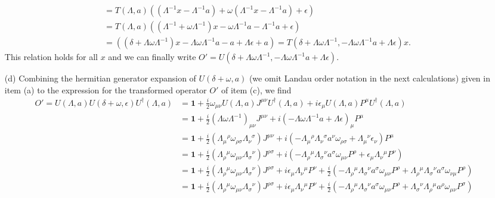 \documentclass[10pt, a4paper]{article}
\begin{document}
\begin{enumerate}
\begin{align*}
    &= T(\Lambda, a) ((\Lambda^{-1} x - \Lambda^{-1} a) + \omega(\Lambda^{-1} x - \Lambda^{-1} a) + \epsilon)\\
    &= T(\Lambda, a) ((\Lambda^{-1} + \omega \Lambda^{-1})  x -\omega \Lambda^{-1} a - \Lambda^{-1} a + \epsilon)\\
    &= ((\delta + \Lambda \omega \Lambda^{-1})  x -\Lambda\omega \Lambda^{-1} a - a + \Lambda \epsilon + a) = T(\delta + \Lambda \omega \Lambda^{-1}, -\Lambda\omega \Lambda^{-1} a + \Lambda \epsilon )x.
  \end{align*}
  This relation holds for all $x$ and we can finally write $O' = U(\delta + \Lambda \omega \Lambda^{-1}, -\Lambda\omega \Lambda^{-1} a + \Lambda \epsilon)$.
\newpage
  \item[(d)] Combining the hermitian generator expansion of $U(\delta + \omega, a)$ (we omit Landau order notation in the next calculations) given in item (a) to the expression for the transformed operator $O'$ of item (c), we find
  \begin{align*}
    O' = U(\Lambda, a) U(\delta+\omega, \epsilon) U^\dagger(\Lambda, a)&=\mathbf{1}+\frac{i}{2} \omega_{\mu \nu} U(\Lambda, a)J^{\mu \nu}U^\dagger(\Lambda, a)+i \epsilon_\mu U(\Lambda, a)P^\mu U^\dagger(\Lambda, a)\\
    &= \mathbf{1}+\frac{i}{2} (\Lambda \omega \Lambda^{-1})_{\mu \nu} J^{\mu \nu}+i (-\Lambda\omega \Lambda^{-1} a + \Lambda \epsilon)_\mu P^\mu\\
    &= \mathbf{1}+\frac{i}{2} (\Lambda_{\mu}{}^{\rho}  \omega_{\rho\sigma} \Lambda_{\nu}{}^{\sigma}) J^{\mu \nu}+i (-\Lambda_{\mu}{}^{\rho}   \Lambda_{\nu}{}^{\sigma} a^{\nu} \omega_{\rho\sigma} + \Lambda_{\mu}{}^{\nu} \epsilon_{\nu}) P^\mu \\
    &= \mathbf{1}+\frac{i}{2} (\Lambda_{\rho}{}^{\mu}  \omega_{\mu\nu} \Lambda_{\sigma}{}^{\nu}) J^{\rho \sigma}+i (-\Lambda_{\rho}{}^{\mu}   \Lambda_{\sigma}{}^{\nu} a^{\sigma} \omega_{\mu\nu} P^\rho +  \epsilon_{\mu} \Lambda_{\nu}{}^{\mu} P^\nu)\\ 
    &= \mathbf{1}+\frac{i}{2} (\Lambda_{\rho}{}^{\mu}  \omega_{\mu\nu} \Lambda_{\sigma}{}^{\nu}) J^{\rho \sigma}+i \epsilon_{\mu} \Lambda_{\nu}{}^{\mu} P^\nu + \frac{i}{2}(-\Lambda_{\rho}{}^{\mu}   \Lambda_{\sigma}{}^{\nu} a^{\sigma} \omega_{\mu\nu} P^\rho +\Lambda_{\rho}{}^{\mu}   \Lambda_{\sigma}{}^{\nu} a^{\sigma} \omega_{\nu\mu} P^\rho)\\ 
    &= \mathbf{1}+\frac{i}{2} (\Lambda_{\rho}{}^{\mu}  \omega_{\mu\nu} \Lambda_{\sigma}{}^{\nu}) J^{\rho \sigma}+i \epsilon_{\mu} \Lambda_{\nu}{}^{\mu} P^\nu + \frac{i}{2}(-\Lambda_{\rho}{}^{\mu}   \Lambda_{\sigma}{}^{\nu} a^{\sigma} \omega_{\mu\nu} P^\rho + \Lambda_{\sigma}{}^{\nu}   \Lambda_{\rho}{}^{\mu} a^{\rho} \omega_{\mu\nu} P^\sigma)\tag{$\star$}

\end{align*}
\end{enumerate}
\end{document}
